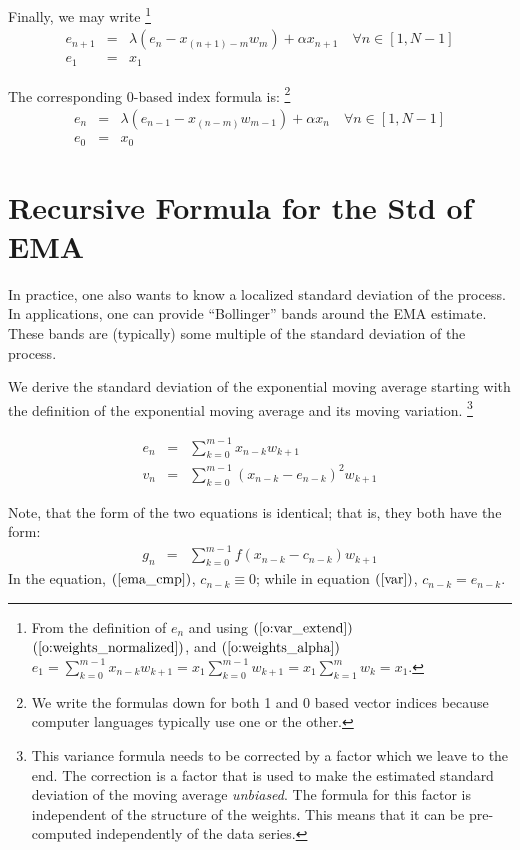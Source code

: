 \documentclass{article}
\begin{document}
Finally, we may write%
\footnote{From the definition of $e_n$ and using 
	$(\ref{o:var_extend})$ $(\ref{o:weights_normalized})$, and $(\ref{o:weights_alpha})$
$e_1 = \sum_{k=0}^{m-1} x_{n-k} w_{k+1} = x_1 \sum_{k=0}^{m-1} w_{k+1} = x_1 \sum_{k=1}^m w_k = x_1$.}
\begin{eqnarray}
    e_{n+1} &=&  \lambda \left(e_n - x_{(n+1) - m} w_m \right) + \alpha x_{n+1} \quad \forall n \in [1, N-1] \\
    e_1     &=&  x_1 
\end{eqnarray}

The corresponding 0-based index formula is:%
\footnote{We write the formulas down for both 1 and  0 based vector indices because
computer languages typically use one or the other.}
\begin{eqnarray}
    e_{n} &=&  \lambda \left( e_{n-1} - x_{(n-m)} w_{m-1} \right) + \alpha x_{n}  \quad \forall n \in [1, N-1] \\
    e_0   &=&  x_0 
\end{eqnarray}

\section{Recursive Formula for the Std of EMA}
In practice, one also wants to know a localized standard deviation of the process.
In applications, one can provide ``Bollinger'' bands around the EMA estimate.
These bands are (typically) some multiple of the standard deviation of the process.

We derive the standard deviation of the exponential moving average starting
with the definition of the exponential moving average and its moving variation.%
\footnote{This variance formula needs to be corrected by a factor which we 
leave to the end. The correction is a factor that is used to make the 
estimated standard deviation of the moving average {\em unbiased\/}.
The formula for this factor is independent of the structure of the weights.
This means that it can be pre-computed independently of the data series.}

\begin{eqnarray}
    e_n &=&  \sum_{k=0}^{m-1} x_{n-k} w_{k+1} \label{ema_cmp} \\
    v_n &=&  \sum_{k=0}^{m-1} (x_{n-k} - e_{n-k})^2 w_{k+1}  \label{var} 
\end{eqnarray}

Note, that the form of the two equations is identical; that is, 
they both have the form:
\begin{eqnarray}
	g_n &=& \sum_{k=0}^{m-1} f(x_{n-k} - c_{n-k}) w_{k+1} 
\end{eqnarray}
In the equation, $(\ref{ema_cmp})$, $c_{n-k} \equiv 0$; while in equation 
$(\ref{var})$, $c_{n-k} = e_{n-k}$.
\end{document}
